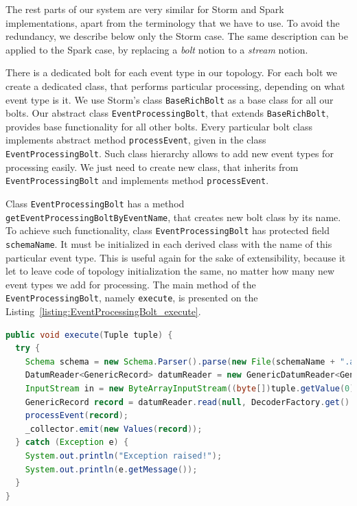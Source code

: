 The rest parts of our system are very similar for Storm and Spark implementations, apart from the terminology that we have to use.
To avoid the redundancy, we describe below only the Storm case.
The same description can be applied to the Spark case, by replacing a \textit{bolt} notion to a \textit{stream} notion. 

There is a dedicated bolt for each event type in our topology.
For each bolt we create a dedicated class, that performs particular processing, depending on what event type is it.
We use Storm's class \lstinline{BaseRichBolt} as a base class for all our bolts.
Our abstract class \lstinline{EventProcessingBolt}, that extends \lstinline{BaseRichBolt}, provides base functionality for all other bolts.
Every particular bolt class implements abstract method \lstinline{processEvent}, given in the class \lstinline{EventProcessingBolt}.
Such class hierarchy allows to add new event types for processing easily.
We just need to create new class, that inherits from \lstinline{EventProcessingBolt} and implements method \lstinline{processEvent}.

Class \lstinline{EventProcessingBolt} has a method \lstinline{getEventProcessingBoltByEventName}, that creates new bolt class by its name.
To achieve such functionality, class \lstinline{EventProcessingBolt} has protected field \lstinline{schemaName}.
It must be initialized in each derived class with the name of this particular event type.
This is useful again for the sake of extensibility, because it let to leave code of topology initialization the same, no matter how many new event types we add for processing.
The main method of the \lstinline{EventProcessingBolt}, namely \lstinline{execute}, is presented on the Listing~\ref{listing:EventProcessingBolt_execute}.

\begin{lstlisting}[float=h, caption=The main method of the EventProcessingBolt., label=listing:EventProcessingBolt_execute, language=Java]
public void execute(Tuple tuple) {
  try {
    Schema schema = new Schema.Parser().parse(new File(schemaName + ".avsc"));
    DatumReader<GenericRecord> datumReader = new GenericDatumReader<GenericRecord>(schema);
    InputStream in = new ByteArrayInputStream((byte[])tuple.getValue(0));
    GenericRecord record = datumReader.read(null, DecoderFactory.get().jsonDecoder(schema, in));
    processEvent(record);
    _collector.emit(new Values(record));
  } catch (Exception e) {
    System.out.println("Exception raised!");
    System.out.println(e.getMessage());
  }
}
\end{lstlisting}

